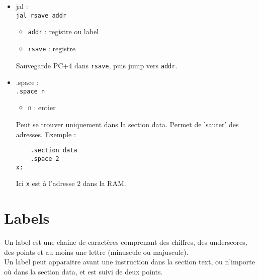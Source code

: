 \documentclass[a4paper]{article}
\begin{document}
\begin{itemize}
        \item jal :\\
        \texttt{jal rsave addr}
        \begin{itemize}
            \item \texttt{addr} : registre ou label
            \item \texttt{rsave} : registre
        \end{itemize}
        Sauvegarde PC+4 dans \texttt{rsave}, puis jump vers \texttt{addr}.

        \item .space :\\
        \texttt{.space n}
        \begin{itemize}
            \item \texttt{n} : entier
        \end{itemize}
        Peut se trouver uniquement dans la section data. Permet de 'sauter' des adresses. 
        Exemple :
\begin{lstlisting}
    .section data
    .space 2
x:  
\end{lstlisting}
    Ici \texttt{x} est à l'adresse $2$ dans la RAM.
        
    \end{itemize}

    \section{Labels}
    Un label est une chaine de caractères comprenant des chiffres, 
    des underscores, des points et au moins une lettre (minuscule ou majuscule).\\
    Un label peut apparaitre avant une instruction dans la section text,
    ou n'importe où dans la section data, et est suivi de deux points.
\end{document}

